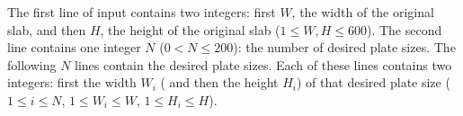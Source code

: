 The first line of input contains two integers: first $W$, the width of the original slab, and then $H$, the height of the original slab ($1 \le W, H \le 600$). The second line contains one integer $N$ ($0 < N \le 200$): the number of desired plate sizes. The following $N$ lines contain the desired plate sizes. Each of these lines contains two integers: first the width $W_i$ ( and then the height $H_i$) of that desired plate size ($1 \le i \le N$, $1 \le W_i \le W$, $1 \le H_i \le H$). 
